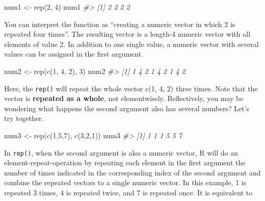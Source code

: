 \documentclass[
]{book}
\newenvironment{Shaded}{\begin{snugshade}}{\end{snugshade}}
\newcommand{\CommentTok}[1]{\textcolor[rgb]{0.56,0.35,0.01}{\textit{#1}}}
\newcommand{\DecValTok}[1]{\textcolor[rgb]{0.00,0.00,0.81}{#1}}
\newcommand{\FunctionTok}[1]{\textcolor[rgb]{0.00,0.00,0.00}{#1}}
\newcommand{\NormalTok}[1]{#1}
\newcommand{\OtherTok}[1]{\textcolor[rgb]{0.56,0.35,0.01}{#1}}
\begin{document}
\begin{Shaded}
\begin{Highlighting}[]
\NormalTok{num1 }\OtherTok{\textless{}{-}} \FunctionTok{rep}\NormalTok{(}\DecValTok{2}\NormalTok{, }\DecValTok{4}\NormalTok{)}
\NormalTok{num1}
\CommentTok{\#\textgreater{} [1] 2 2 2 2}
\end{Highlighting}
\end{Shaded}

You can interpret the function as ``creating a numeric vector in which 2 is repeated four times''. The resulting vector is a length-4 numeric vector with all elements of value 2. In addition to one single value, a numeric vector with several values can be assigned in the first argument.

\begin{Shaded}
\begin{Highlighting}[]
\NormalTok{num2 }\OtherTok{\textless{}{-}} \FunctionTok{rep}\NormalTok{(}\FunctionTok{c}\NormalTok{(}\DecValTok{1}\NormalTok{, }\DecValTok{4}\NormalTok{, }\DecValTok{2}\NormalTok{), }\DecValTok{3}\NormalTok{)}
\NormalTok{num2}
\CommentTok{\#\textgreater{} [1] 1 4 2 1 4 2 1 4 2}
\end{Highlighting}
\end{Shaded}

Here, the \texttt{rep()} will repeat the whole vector c(1, 4, 2) three times. Note that the vector is \textbf{repeated as a whole}, not elementwisely. Reflectively, you may be wondering what happens the second argument also has several numbers? Let's try together.

\begin{Shaded}
\begin{Highlighting}[]
\NormalTok{num3 }\OtherTok{\textless{}{-}} \FunctionTok{rep}\NormalTok{(}\FunctionTok{c}\NormalTok{(}\DecValTok{1}\NormalTok{,}\DecValTok{5}\NormalTok{,}\DecValTok{7}\NormalTok{), }\FunctionTok{c}\NormalTok{(}\DecValTok{3}\NormalTok{,}\DecValTok{2}\NormalTok{,}\DecValTok{1}\NormalTok{))}
\NormalTok{num3}
\CommentTok{\#\textgreater{} [1] 1 1 1 5 5 7}
\end{Highlighting}
\end{Shaded}

In \texttt{rep()}, when the second argument is also a numeric vector, R will do an element-repeat-operation by repeating each element in the first argument the number of times indicated in the corresponding index of the second argument and combine the repeated vectors to a single numeric vector. In this example, 1 is repeated 3 times, 4 is repeated twice, and 7 is repeated once. It is equivalent to
\end{document}
